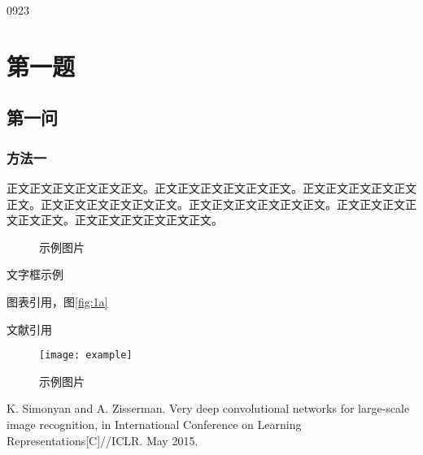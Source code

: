 \documentclass[hyperref,UTF8,12pt]{report}
\begin{document}
	\date{2021}{09}{23}

	{
		
	}

	\section{第一题}
	\subsection{第一问}
	\subsubsection{方法一}
	正文正文正文正文正文正文。正文正文正文正文正文正文。正文正文正文正文正文正文。正文正文正文正文正文正文。正文正文正文正文正文正文。正文正文正文正文正文正文。正文正文正文正文正文正文。
	
	
	

	\begin{figure}[H]
		\caption{示例图片}
	\end{figure}

	\begin{tcolorbox}[notitle,boxrule=10pt,colback=gray!20,colframe=gray!20]
		文字框示例
		
		图表引用，图\ref{fig:1a}
		
		文献引用\cite{VGGNet}
	\end{tcolorbox}
	
	
	
	\begin{figure}[htbp]
		\centering
		\texttt{[image: example]}
		\caption{示例图片}
		\label{fig:example}
	\end{figure}

	
	
	\begin{thebibliography}{99}  
		 K. Simonyan and A. Zisserman. Very deep convolutional networks for large-scale image recognition, in International Conference on Learning Representations[C]//ICLR. May 2015.
	\end{thebibliography}
	
	{
		\newpage
		
	}
	
	
\end{document}
